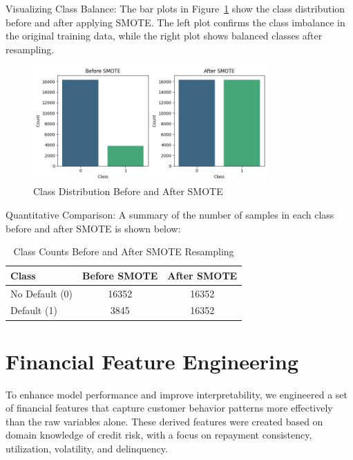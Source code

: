 \documentclass[12pt,a4paper]{article}
\begin{document}
Visualizing Class Balance: The bar plots in Figure~\ref{fig:smote_class_balance} show the class distribution before and after applying SMOTE. The left plot confirms the class imbalance in the original training data, while the right plot shows balanced classes after resampling.
\begin{figure}[H]
    \centering
    \includegraphics[width=0.8\textwidth]{figures/11.png}
    \caption{Class Distribution Before and After SMOTE}
    \label{fig:smote_class_balance}
\end{figure}

Quantitative Comparison: A summary of the number of samples in each class before and after SMOTE is shown below:
\begin{table}[H]
    \centering
    \begin{tabular}{lcc}
        \toprule
        Class & Before SMOTE & After SMOTE \\
        \midrule
        No Default (0) & 16352 & 16352 \\
        Default (1) & 3845 & 16352 \\
        \bottomrule
    \end{tabular}
    \caption{Class Counts Before and After SMOTE Resampling}
\end{table}



\section{Financial Feature Engineering}

To enhance model performance and improve interpretability, we engineered a set of financial features
that capture customer behavior patterns more effectively than the raw variables alone. These
derived features were created based on domain knowledge of credit risk, with a focus on repayment
consistency, utilization, volatility, and delinquency.
\end{document}
